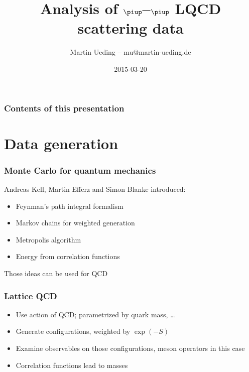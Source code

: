 \documentclass[english, fleqn]{beamer}
\title{Analysis of $\piup$--$\piup$ LQCD scattering data}
\author{Martin Ueding – mu@martin-ueding.de}
\date{2015-03-20}
\begin{document}
\begin{frame}
    \titlepage
\end{frame}

\begin{frame}
    \frametitle{Contents of this presentation}
    \tableofcontents
\end{frame}


\section{Data generation}

\begin{frame}
    \frametitle{Monte Carlo for quantum mechanics}

    Andreas Kell, Martin Efferz and Simon Blanke introduced:
    \begin{itemize}
        \item
            Feynman's path integral formalism
        \item
            Markov chains for weighted generation
        \item
            Metropolis algorithm
        \item
            Energy from correlation functions
    \end{itemize}

    Those ideas can be used for QCD
\end{frame}

\begin{frame}
    \frametitle{Lattice QCD}

    \begin{itemize}
        \item
            Use action of QCD; parametrized by quark mass, …
        \item
            Generate configurations, weighted by $\exp(-S)$
        \item
            Examine observables on those configurations, meson operators in
            this case
        \item
            Correlation functions lead to masses
    \end{itemize}
\end{frame}

\end{document}
